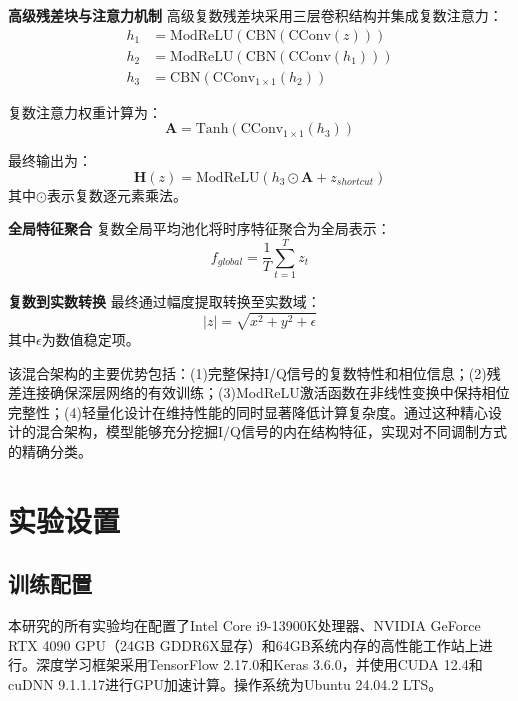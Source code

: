 \documentclass[conference]{IEEEtran}
\begin{document}
\textbf{高级残差块与注意力机制} 高级复数残差块采用三层卷积结构并集成复数注意力：
\begin{align}
h_1 &= \text{ModReLU}(\text{CBN}(\text{CConv}(z))) \\
h_2 &= \text{ModReLU}(\text{CBN}(\text{CConv}(h_1))) \\
h_3 &= \text{CBN}(\text{CConv}_{1 \times 1}(h_2))
\end{align}

复数注意力权重计算为：
\begin{equation}
\mathbf{A} = \text{Tanh}(\text{CConv}_{1 \times 1}(h_3))
\end{equation}

最终输出为：
\begin{equation}
\mathbf{H}(z) = \text{ModReLU}(h_3 \odot \mathbf{A} + z_{shortcut})
\end{equation}
其中$\odot$表示复数逐元素乘法。

\textbf{全局特征聚合} 复数全局平均池化将时序特征聚合为全局表示：
\begin{equation}
f_{global} = \frac{1}{T} \sum_{t=1}^T z_t
\end{equation}

\textbf{复数到实数转换} 最终通过幅度提取转换至实数域：
\begin{equation}
|z| = \sqrt{x^2 + y^2 + \epsilon}
\end{equation}
其中$\epsilon$为数值稳定项。



该混合架构的主要优势包括：(1)完整保持I/Q信号的复数特性和相位信息；(2)残差连接确保深层网络的有效训练；(3)ModReLU激活函数在非线性变换中保持相位完整性；(4)轻量化设计在维持性能的同时显著降低计算复杂度。通过这种精心设计的混合架构，模型能够充分挖掘I/Q信号的内在结构特征，实现对不同调制方式的精确分类。



\section{实验设置}

\subsection{训练配置}

本研究的所有实验均在配置了Intel Core i9-13900K处理器、NVIDIA GeForce RTX 4090 GPU（24GB GDDR6X显存）和64GB系统内存的高性能工作站上进行。深度学习框架采用TensorFlow 2.17.0和Keras 3.6.0，并使用CUDA 12.4和cuDNN 9.1.1.17进行GPU加速计算。操作系统为Ubuntu 24.04.2 LTS。
\end{document}
